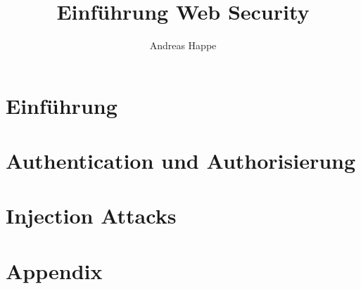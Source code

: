\documentclass{book}
\begin{document}
\title{Einführung Web Security}
\author{Andreas Happe}


\tableofcontents %



\mainmatter

\part{Einführung}











\part{Authentication und Authorisierung}









\part{Injection Attacks}







\appendix

\part{Appendix}




\end{document}
